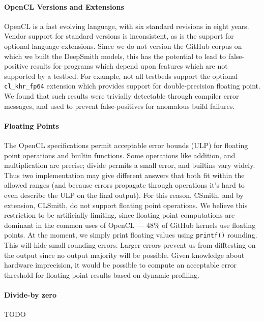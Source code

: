 \paragraph{OpenCL Versions and Extensions} OpenCL is a fast evolving language, with six standard revisions in eight years. Vendor support for standard versions is inconsistent, as is the support for optional language extensions. Since we do not version the GitHub corpus on which we built the DeepSmith models, this has the potential to lead to false-positive results for programs which depend upon features which are not supported by a testbed. For example, not all testbeds support the optional \texttt{cl\_khr\_fp64} extension which provides support for double-precision floating point. We found that such results were trivially detectable through compiler error messages, and used to prevent false-positives for anomalous build failures.

\paragraph{Floating Points} The OpenCL specifications permit acceptable error bounds (ULP) for floating point operations and builtin functions. Some operations like addition, and multiplication are precise; divide permits a small error, and builtins vary widely. Thus two implementation may give different answers that both fit within the allowed ranges (and because errors propagate through operations it's hard to even describe the ULP on the final output). For this reason, CSmith, and by extension, CLSmith, do not support floating point operations. We believe this restriction to be artificially limiting, since floating point computations are dominant in the common uses of OpenCL --- %
48\% of GitHub kernels use floating points. At the moment, we simply print floating values using \texttt{printf()} rounding. This will hide small rounding errors. Larger errors prevent us from difftesting on the output since no output majority will be possible. Given knowledge about hardware imprecision, it would be possible to compute an acceptable error threshold for floating point results based on dynamic profiling.

\paragraph{Divide-by zero} TODO


